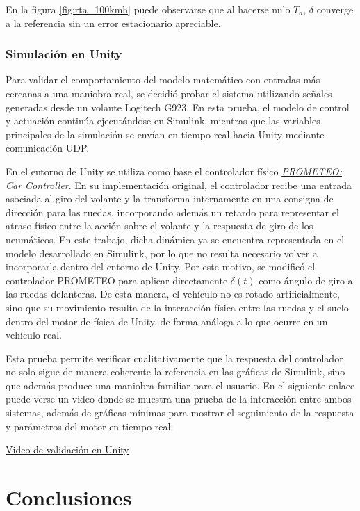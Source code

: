 \documentclass{article}
\begin{document}
En la figura \ref{fig:rta_100kmh} puede observarse que al hacerse nulo $T_a$, $\delta$ converge a la referencia sin un error estacionario apreciable. 

\subsubsection{Simulación en Unity}

Para validar el comportamiento del modelo matemático con entradas más cercanas a una maniobra real, se decidió probar el sistema utilizando señales generadas desde un volante Logitech G923. En esta prueba, el modelo de control y actuación continúa ejecutándose en Simulink, mientras que las variables principales de la simulación se envían en tiempo real hacia Unity mediante comunicación UDP.

En el entorno de Unity se utiliza como base el controlador físico \hyperlink{ref:prometeo-car-controller}{\textit{PROMETEO: Car Controller}}. En su implementación original, el controlador recibe una entrada asociada al giro del volante y la transforma internamente en una consigna de dirección para las ruedas, incorporando además un retardo para representar el atraso físico entre la acción sobre el volante y la respuesta de giro de los neumáticos. En este trabajo, dicha dinámica ya se encuentra representada en el modelo desarrollado en Simulink, por lo que no resulta necesario volver a incorporarla dentro del entorno de Unity. Por este motivo, se modificó el controlador PROMETEO para aplicar directamente $\delta(t)$ como ángulo de giro a las ruedas delanteras. De esta manera, el vehículo no es rotado artificialmente, sino que su movimiento resulta de la interacción física entre las ruedas y el suelo dentro del motor de física de Unity, de forma análoga a lo que ocurre en un vehículo real.

Esta prueba permite verificar cualitativamente que la respuesta del controlador no solo sigue de manera coherente la referencia en las gráficas de Simulink, sino que además produce una maniobra familiar para el usuario. En el siguiente enlace puede verse un video donde se muestra una prueba de la interacción entre ambos sistemas, además de gráficas mínimas para mostrar el seguimiento de la respuesta y parámetros del motor en tiempo real:

\begin{center}
\href{URL_DEL_VIDEO}{Video de validación en Unity}
\end{center}

\section{Conclusiones}
\end{document}
